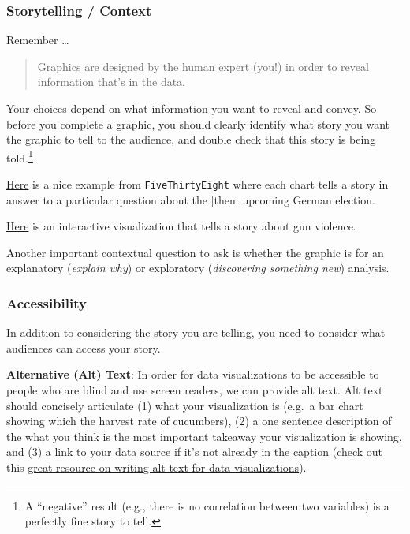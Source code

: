 \documentclass[
  letterpaper,
  DIV=11,
  numbers=noendperiod]{scrreprt}
\begin{document}
\subsubsection*{Storytelling / Context}\label{storytelling-context}

Remember \ldots{}

\begin{quote}
Graphics are designed by the human expert (you!) in order to reveal
information that's in the data.
\end{quote}

Your choices depend on what information you want to reveal and convey.
So before you complete a graphic, you should clearly identify what story
you want the graphic to tell to the audience, and double check that this
story is being told.\footnote{A ``negative'' result (e.g., there is no
  correlation between two variables) is a perfectly fine story to tell.}

\href{https://fivethirtyeight.com/features/six-charts-to-help-americans-understand-the-upcoming-german-election/}{Here}
is a nice example from \texttt{FiveThirtyEight} where each chart tells a
story in answer to a particular question about the {[}then{]} upcoming
German election.

\href{https://fivethirtyeight.com/features/gun-deaths/}{Here} is an
interactive visualization that tells a story about gun violence.

Another important contextual question to ask is whether the graphic is
for an explanatory (\emph{explain why}) or exploratory
(\emph{discovering something new}) analysis.

\subsubsection*{Accessibility}\label{accessibility}

In addition to considering the story you are telling, you need to
consider what audiences can access your story.

\textbf{Alternative (Alt) Text}: In order for data visualizations to be
accessible to people who are blind and use screen readers, we can
provide alt text. Alt text should concisely articulate (1) what your
visualization is (e.g.~a bar chart showing which the harvest rate of
cucumbers), (2) a one sentence description of the what you think is the
most important takeaway your visualization is showing, and (3) a link to
your data source if it's not already in the caption (check out this
\href{https://medium.com/nightingale/writing-alt-text-for-data-visualization-2a218ef43f81}{great
resource on writing alt text for data visualizations}).
\end{document}
